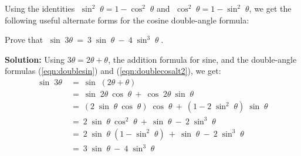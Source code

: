 Using the identities $\;\sin^2 \;\theta = 1 - \cos^2 \;\theta$ and $\;\cos^2 \;\theta = 1 - \sin^2 \;\theta$, we get the
following useful alternate forms for the cosine double-angle formula:

\begin{center}\end{center}

\begin{exmp}
 Prove that $\;\sin\;3\theta ~=~ 3\;\sin\;\theta ~-~ 4\;\sin^3 \;\theta\;$.\vspace{1mm}
 \par\noindent\textbf{Solution:} Using $3\theta = 2\theta + \theta$, the addition formula for sine, and the
 double-angle formulas (\ref{eqn:doublesin}) and (\ref{eqn:doublecosalt2}), we get:
 \begin{align*}
  \sin\;3\theta ~&=~ \sin\;(2\theta+\theta)\\
  &=~ \sin\;2\theta~\cos\;\theta ~+~ \cos\;2\theta~\sin\;\theta\\
  &=~ (2\;\sin\;\theta~\cos\;\theta)\;\cos\;\theta ~+~ (1 - 2\;\sin^2 \;\theta)\;\sin\;\theta\\
  &=~ 2\;\sin\;\theta~\cos^2 \;\theta ~+~ \sin\;\theta ~-~ 2\;\sin^3 \;\theta\\
  &=~ 2\;\sin\;\theta\;(1 - \sin^2 \;\theta) ~+~ \sin\;\theta ~-~ 2\;\sin^3 \;\theta\\
  &=~ 3\;\sin\;\theta ~-~ 4\;\sin^3 \;\theta
 \end{align*}
\end{exmp}
\divider
\newpage
